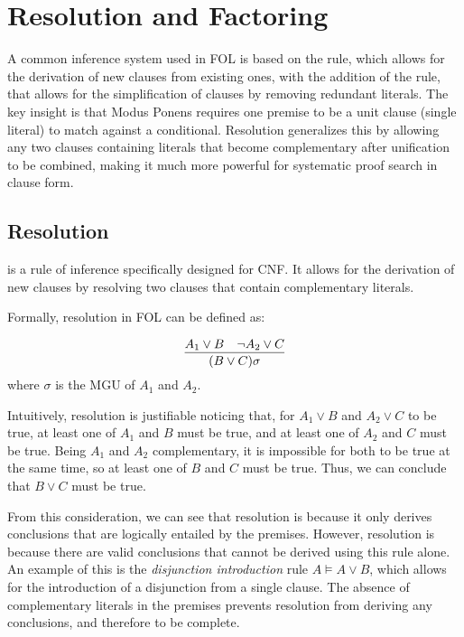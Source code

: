 \section{Resolution and Factoring}\label{sec:resolution-factoring}

A common inference system used in FOL is based on the  rule, which allows for the derivation of new clauses from existing ones, with the addition of the  rule, that allows for the simplification of clauses by removing redundant literals.
The key insight is that Modus Ponens requires one premise to be a unit clause (single literal) to match against a conditional.
Resolution generalizes this by allowing any two clauses containing literals that become complementary after unification to be combined, making it much more powerful for systematic proof search in clause form.

\subsection{Resolution}\label{subsec:resolution}

 is a rule of inference specifically designed for CNF\@. It allows for the derivation of new clauses by resolving two clauses that contain complementary literals.

Formally, resolution in FOL can be defined as:

\begin{equation}
  \infer{(B\lor C)\sigma}{A_1 \lor B & \neg A_2 \lor C}
\end{equation}
\indent where \(\sigma\) is the MGU of \(A_1\) and \(A_2\).

\noindent Intuitively, resolution is justifiable noticing that, for \(A_1 \lor B\) and \(A_2 \lor C\) to be true, at least one of \(A_1\) and \(B\) must be true, and at least one of \(A_2\) and \(C\) must be true.
Being \(A_1\) and \(A_2\) complementary, it is impossible for both to be true at the same time, so at least one of \(B\) and \(C\) must be true. Thus, we can conclude that \(B \lor C\) must be true.

From this consideration, we can see that resolution is  because it only derives conclusions that are logically entailed by the premises.
However, resolution is  because there are valid conclusions that cannot be derived using this rule alone.
An example of this is the \emph{disjunction introduction} rule \(A \models A \lor B\), which allows for the introduction of a disjunction from a single clause.
The absence of complementary literals in the premises prevents resolution from deriving any conclusions, and therefore to be complete.


